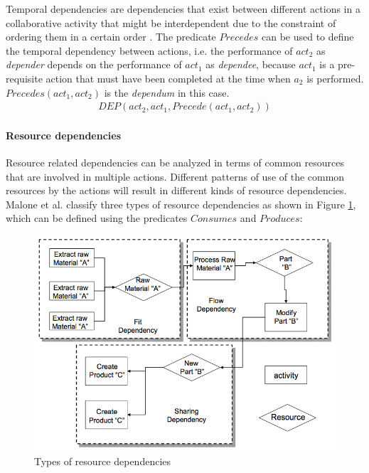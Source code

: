 Temporal dependencies are dependencies that exist between different actions in a collaborative activity that might be interdependent due to the constraint of ordering them in a certain order \cite{sikora1998a}. The predicate $Precedes$ can be used to define the temporal dependency between actions, i.e. the performance of $act_2$ as \emph{depender} depends on the performance of $act_1$ as \emph{dependee}, because $act_1$ is a pre-requisite action that must have been completed at the time when $a_2$ is performed. $Precedes(act_1, act_2)$ is the \emph{dependum} in this case.
\begin{align*} 
	 DEP(act_2, act_1, Precede(act_1, act_2))
\end{align*}

\paragraph*{Resource dependencies} %
\label{par:resource_dependencies}
Resource related dependencies can be analyzed in terms of common resources that are involved in multiple actions. Different patterns of use of the common resources by the actions will result in different kinds of resource dependencies. Malone et al. \cite{malone1994interdisciplinary} classify three types of resource dependencies as shown in Figure \ref{fig:resource_deps}, which can be defined using the predicates $Consumes$ and $Produces$:

\begin{figure}[htbp] %
   \centering
   \includegraphics[width=4.5in]{resource_deps.jpg} 
   \caption{Types of resource dependencies \cite{malone1994interdisciplinary}}
   \label{fig:resource_deps}
\end{figure}

